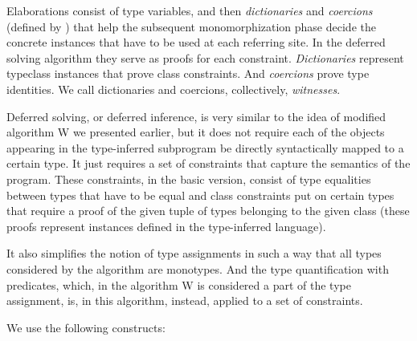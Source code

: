 Elaborations consist of type variables, and then \emph{dictionaries} and \emph{coercions} (defined by \citet{vytiniotis2011outsidein}) that help the subsequent monomorphization phase decide the concrete instances that have to be used at each referring site. In the deferred solving algorithm they serve as proofs for each constraint. \emph{Dictionaries} represent typeclass instances that prove class constraints. And \emph{coercions} prove type identities. We call dictionaries and coercions, collectively, \emph{witnesses}.

Deferred solving, or deferred inference, is very similar to the idea of modified algorithm W we presented earlier, but it does not require each of the objects appearing in the type-inferred subprogram be directly syntactically mapped to a certain type. It just requires a set of constraints that capture the semantics of the program. These constraints, in the basic version, consist of type equalities between types that have to be equal and class constraints put on certain types that require a proof of the given tuple of types belonging to the given class (these proofs represent instances defined in the type-inferred language).

It also simplifies the notion of type assignments in such a way that all types considered by the algorithm are monotypes. And the type quantification with predicates, which, in the algorithm W is considered a part of the type assignment, is, in this algorithm, instead, applied to a set of constraints.

We use the following constructs:


